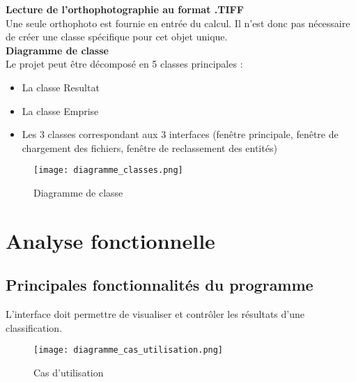 \noindent\textbf{Lecture de l’orthophotographie au format .TIFF}\\

Une seule orthophoto est fournie en entrée du calcul. Il n’est donc pas nécessaire de créer une classe spécifique pour cet objet unique.\\

\noindent\textbf{Diagramme de classe}\\

Le projet peut être décomposé en 5 classes principales :
\begin{itemize}[label=$\rightarrow$]
	\item La classe Resultat
	\item La classe Emprise
	\item Les 3 classes correspondant aux 3 interfaces (fenêtre principale, fenêtre de chargement des fichiers, fenêtre de reclassement des entités)\\
\end{itemize}

\begin{figure}[!h]
	\begin{center}
		\texttt{[image: diagramme\_classes.png]}  \\
		\caption[Diagramme de classe]{Diagramme de classe}
		\label{fig:classe}
	\end{center}
\end{figure}



\newpage

\section{Analyse fonctionnelle}

\subsection{Principales fonctionnalités du programme}

L'interface doit permettre de visualiser et contrôler les résultats d'une classification.

\begin{figure}[h]
	\begin{center}
		\texttt{[image: diagramme\_cas\_utilisation.png]}  \\
		\caption[Cas d'utilisation]{Cas d'utilisation}
		\label{fig:utilisation}
	\end{center}
\end{figure}


